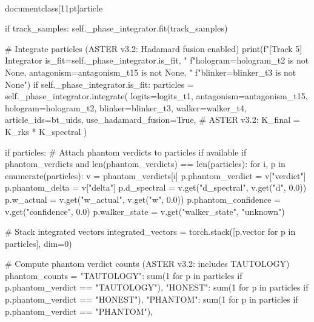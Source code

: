 \\documentclass[11pt]{article}
\begin{document}
\begin{CodeBlock}
                    if track_samples:
                        self._phase_integrator.fit(track_samples)

                # Integrate particles (ASTER v3.2: Hadamard fusion enabled)
                print(f"[Track 5] Integrator is_fit={self._phase_integrator.is_fit}, "
                      f"hologram={hologram_t2 is not None}, antagonism={antagonism_t15 is not None}, "
                      f"blinker={blinker_t3 is not None}")
                if self._phase_integrator.is_fit:
                    particles = self._phase_integrator.integrate(
                        logits=logits_t1,
                        antagonism=antagonism_t15,
                        hologram=hologram_t2,
                        blinker=blinker_t3,
                        walker=walker_t4,
                        article_ids=bt_uids,
                        use_hadamard_fusion=True,  # ASTER v3.2: K_final = K_rks * K_spectral
                    )

                    if particles:
                        # Attach phantom verdicts to particles if available
                        if phantom_verdicts and len(phantom_verdicts) == len(particles):
                            for i, p in enumerate(particles):
                                v = phantom_verdicts[i]
                                p.phantom_verdict = v["verdict"]
                                p.phantom_delta = v["delta"]
                                p.d_spectral = v.get("d_spectral", v.get("d", 0.0))
                                p.w_actual = v.get("w_actual", v.get("w", 0.0))
                                p.phantom_confidence = v.get("confidence", 0.0)
                                p.walker_state = v.get("walker_state", "unknown")

                        # Stack integrated vectors
                        integrated_vectors = torch.stack([p.vector for p in particles], dim=0)

                        # Compute phantom verdict counts (ASTER v3.2: includes TAUTOLOGY)
                        phantom_counts = {
                            "TAUTOLOGY": sum(1 for p in particles if p.phantom_verdict == "TAUTOLOGY"),
                            "HONEST": sum(1 for p in particles if p.phantom_verdict == "HONEST"),
                            "PHANTOM": sum(1 for p in particles if p.phantom_verdict == "PHANTOM"),
                        }


\end{CodeBlock}
\end{document}
